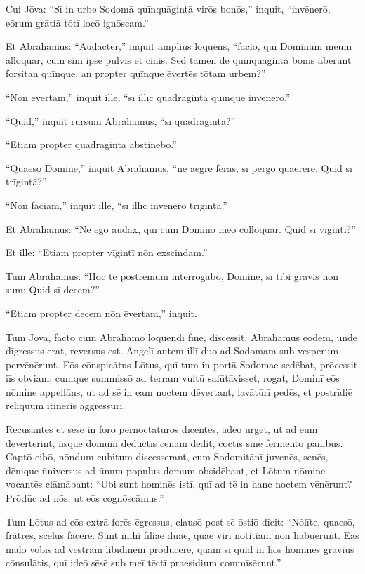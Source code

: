 \Versus Cui Jōva: ``Sī in urbe Sodomā quīnquāgintā virōs bonōs,'' inquit, ``invēnerō, eōrum grātiā tōtī locō ignōscam.''

\Versus Et Abrāhāmus: ``Audācter,'' inquit amplius loquēns, ``faciō, quī Dominum meum alloquar, cum sim ipse pulvis et cinis.
\Versus Sed tamen dē quīnquāgintā bonīs aberunt forsitan quīnque, an propter quīnque ēvertēs tōtam urbem?''

``Nōn ēvertam,'' inquit ille, ``sī illīc quadrāgintā quīnque invēnerō.''

\Versus ``Quid,'' inquit rūrsum Abrāhāmus, ``sī quadrāgintā?''

``Etiam propter quadrāgintā abstinēbō.''

\Versus ``Quaesō Domine,'' inquit Abrāhāmus, ``nē aegrē ferās, sī pergō quaerere. Quid sī trīgintā?''

``Nōn faciam,'' inquit ille, ``sī illīc invēnerō trīgintā.''

\Versus Et Abrāhāmus: ``Nē ego audāx, quī cum Dominō meō colloquar. Quid sī vīgintī?''

Et ille: ``Etiam propter vīgintī nōn exscindam.''

\Versus Tum Abrāhāmus: ``Hoc tē postrēmum interrogābō, Domine, sī tibi gravis nōn sum: Quid sī decem?''

``Etiam propter decem nōn ēvertam,'' inquit.



\Caput
\Versus Tum Jōva, factō cum Abrāhāmō loquendī fīne, discessit. Abrāhāmus eōdem, unde dīgressus erat, reversus est. Angelī autem illī duo ad Sodomam sub vesperum pervēnērunt. Eōs cōnspicātus Lōtus, quī tum in portā Sodomae sedēbat, prōcessit iīs obviam, cumque summissō ad terram vultū salūtāvisset,
\Versus rogat, Dominī eōs nōmine appellāns, ut ad sē in eam noctem dēvertant, lavātūrī pedēs, et postrīdiē reliquum itineris aggressūrī.

Recūsantēs et sēsē in forō pernoctātūrōs dīcentēs,
\Versus adeō urget, ut ad eum dēverterint, iīsque domum dēductīs cēnam dedit, coctīs sine fermentō pānibus.
\Versus Captō cibō, nōndum cubitum discesserant, cum Sodomitānī juvenēs, senēs, dēnique ūniversus ad ūnum populus domum obsidēbant,
\Versus et Lōtum nōmine vocantēs clāmābant: ``Ubi sunt hominēs istī, quī ad tē in hanc noctem vēnērunt? Prōdūc ad nōs, ut eōs cognōscāmus.''

\Versus Tum Lōtus ad eōs extrā forēs ēgressus, clausō post sē ōstiō dīcit:
\Versus ``Nōlīte, quaesō, frātrēs, scelus facere.
\Versus Sunt mihi fīliae duae, quae virī nōtitiam nōn habuērunt. Eās mālō vōbīs ad vestram libīdinem prōdūcere, quam sī quid in hōs hominēs gravius cōnsulātis, quī ideō sēsē sub meī tēctī praesidium commīsērunt.''

